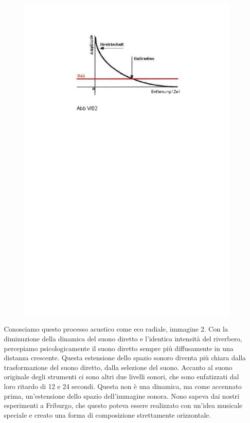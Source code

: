 \begin{figure}[htbp]
\begin{center}
\includegraphics[width=1\textwidth]{images/nono/hph/ab_v_02.jpg}
\caption{}
\label{hph-img2}
\end{center}
\end{figure}

Conosciamo questo processo acustico come eco radiale, immagine 2. Con la diminuzione della dinamica del suono diretto e l'identica intensità del riverbero, percepiamo psicologicamente il suono diretto sempre più diffusamente in una distanza crescente. Questa estensione dello spazio sonoro diventa più chiara dalla trasformazione del suono diretto, dalla selezione del suono. Accanto al suono originale degli strumenti ci sono altri due livelli sonori, che sono enfatizzati dal loro ritardo di 12 e 24 secondi. Questa non è una dinamica, ma come accennato prima, un'estensione dello spazio dell'immagine sonora.
Nono sapeva dai nostri esperimenti a Friburgo, che questo poteva essere realizzato con un'idea musicale speciale e creato una forma di composizione strettamente orizzontale.


